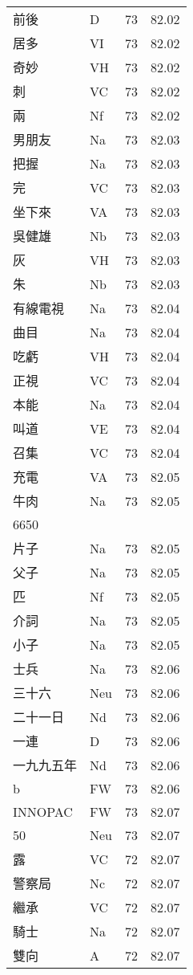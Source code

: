 \documentclass[twocolumn]{book}
\begin{document}
\begin{supertabular}{llrr}
前後 & D & 73 &  82.02\\
居多 & VI & 73 &  82.02\\
奇妙 & VH & 73 &  82.02\\
刺 & VC & 73 &  82.02\\
兩 & Nf & 73 &  82.02\\
男朋友 & Na & 73 &  82.03\\
把握 & Na & 73 &  82.03\\
完 & VC & 73 &  82.03\\
坐下來 & VA & 73 &  82.03\\
吳健雄 & Nb & 73 &  82.03\\
灰 & VH & 73 &  82.03\\
朱 & Nb & 73 &  82.03\\
有線電視 & Na & 73 &  82.04\\
曲目 & Na & 73 &  82.04\\
吃虧 & VH & 73 &  82.04\\
正視 & VC & 73 &  82.04\\
本能 & Na & 73 &  82.04\\
叫道 & VE & 73 &  82.04\\
召集 & VC & 73 &  82.04\\
充電 & VA & 73 &  82.05\\
牛肉 & Na & 73 &  82.05\\
6650\\
片子 & Na & 73 &  82.05\\
父子 & Na & 73 &  82.05\\
匹 & Nf & 73 &  82.05\\
介詞 & Na & 73 &  82.05\\
小子 & Na & 73 &  82.05\\
士兵 & Na & 73 &  82.06\\
三十六 & Neu & 73 &  82.06\\
二十一日 & Nd & 73 &  82.06\\
一連 & D & 73 &  82.06\\
一九九五年 & Nd & 73 &  82.06\\
b & FW & 73 &  82.06\\
INNOPAC & FW & 73 &  82.07\\
50 & Neu & 73 &  82.07\\
露 & VC & 72 &  82.07\\
警察局 & Nc & 72 &  82.07\\
繼承 & VC & 72 &  82.07\\
騎士 & Na & 72 &  82.07\\
雙向 & A & 72 &  82.07\\

\end{supertabular}
\end{document}
